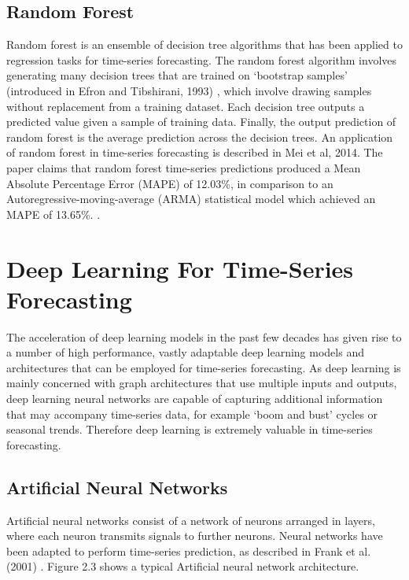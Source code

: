 \subsection{Random Forest}
Random forest is an ensemble of decision tree algorithms that has been applied to regression tasks for time-series forecasting. The random forest algorithm involves generating many decision trees that are trained on `bootstrap samples' (introduced in Efron and Tibshirani, 1993) \cite{bootstrap}, which involve drawing samples without replacement from a training dataset. Each decision tree outputs a predicted value given a sample of training data. Finally, the output prediction of random forest is the average prediction across the decision trees. An application of random forest in time-series forecasting is described in Mei et al, 2014. The paper claims that random forest time-series predictions  produced a Mean Absolute Percentage Error (MAPE) of 12.03\%, in comparison to an Autoregressive-moving-average (ARMA) statistical model which achieved an MAPE of 13.65\%. \cite{mei2014random}.

\section{Deep Learning For Time-Series Forecasting}
The acceleration of deep learning models in the past few decades has given rise to a number of high performance, vastly adaptable deep learning models and architectures that can be employed for time-series forecasting. As deep learning is mainly concerned with graph architectures that use multiple inputs and outputs, deep learning neural networks are capable of capturing additional information that may accompany time-series data, for example `boom and bust' cycles or seasonal trends. Therefore deep learning is extremely valuable in time-series forecasting.

\subsection{Artificial Neural Networks}
Artificial neural networks consist of a network of neurons arranged in layers, where each neuron transmits signals to further neurons. Neural networks have been adapted to perform time-series prediction, as described in Frank et al. (2001) \cite{frank2001time}. Figure 2.3 shows a typical Artificial neural network architecture.

